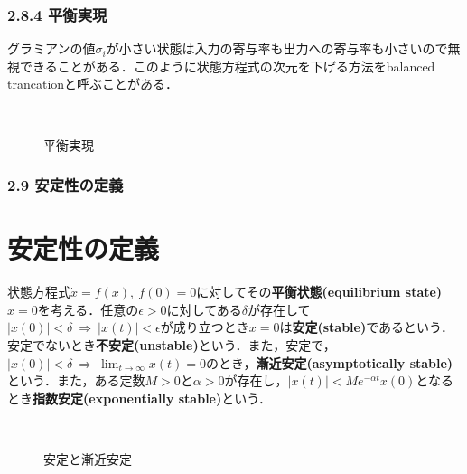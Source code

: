 \begin{frame}[t]
\frametitle{2.8.4 平衡実現}

グラミアンの値$\sigma_i$が小さい状態は入力の寄与率も出力への寄与率も小さいので無視できることがある．このように状態方程式の次元を下げる方法をbalanced trancationと呼ぶことがある．


\begin{figure}[htbp]
 \begin{center}
  \caption{平衡実現}
  \label{fig:b_gram}
 \end{center}
\end{figure}


\pagebreak


\end{frame}

\begin{frame}[t]
\frametitle{2.9 安定性の定義}
\section{安定性の定義}

状態方程式$\dot{x}=f(x), \ f(0)=0$に対してその{\bf 平衡状態(equilibrium state)}$x=0$を考える．任意の$\epsilon>0$に対してある$\delta$が存在して$\vert x(0) \vert < \delta \ \Rightarrow \ \vert x(t) \vert < \epsilon$が成り立つとき$x=0$は{\bf 安定(stable)}であるという．安定でないとき{\bf 不安定(unstable)}という．また，安定で，$\vert x(0) \vert < \delta \ \Rightarrow \ \lim_{t \rightarrow \infty} x(t) =0$のとき，{\bf 漸近安定(asymptotically stable)}という．また，ある定数$M>0$と$\alpha>0$が存在し，$\vert x(t) \vert < M e^{-\alpha t} x(0)$となるとき{\bf 指数安定(exponentially stable)}という．

\begin{figure}[htbp]
 \begin{center}
  \caption{安定と漸近安定}
  \label{fig:stability}
 \end{center}
\end{figure}
\end{frame}


